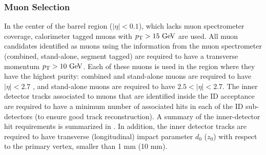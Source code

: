 \subsubsection*{Muon Selection}
In the center of the barrel region ($|\eta| < 0.1$), which lacks muon spectrometer
coverage, calorimeter tagged muons with $\pt > 15 \GeV$ are used. All muon candidates
identified as muons using the information from the muon spectrometer (combined,
stand-alone, segment tagged) are required  to have a transverse momentum 
$\pt > 10 \GeV$. Each of these muons is used in the region where they have
the highest purity: combined and stand-alone muons are required to have $|\eta| < 2.7$
, and stand-alone muons are required to have $2.5 < |\eta| < 2.7$. The inner
detector tracks associated to muons that are identified inside the ID acceptance are
required to have a minimum number of associated hits in each of the ID sub-detectors
(to ensure good track reconstruction). A summary of the inner-detector hit 
requirements is summarized in . In addition, the inner
detector tracks are required to have transverse (longitudinal) impact parameter
$d_0$ ($z_0$) with respect to the primary vertex, smaller than 1 mm (10 mm).

